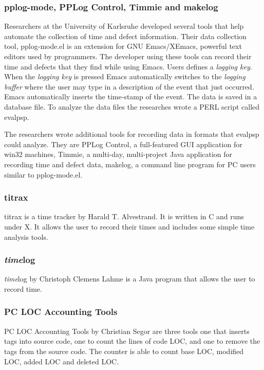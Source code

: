 \subsubsection{pplog-mode, PPLog Control, Timmie and makelog}
Researchers at the University of Karlsruhe developed several tools that help
automate the collection of time and defect information\cite{Resources98}. Their
data collection tool, pplog-mode.el is an extension for GNU
Emacs\cite{GNUEmacs99}/XEmacs\cite{XEmacs99}, powerful text editors used by
programmers.  The developer using these tools can record their time and defects
that they find while using Emacs. Users defines a {\em logging key}.  When the
{\em logging key} is pressed Emacs automatically switches to the {\em logging
  buffer} where the user may type in a description of the event that just
occurred.  Emacs automatically inserts the time-stamp of the event.  The data is
saved in a database file.  To analyze the data files the researches wrote a
PERL script called evalpsp.

The researchers wrote additional tools for recording data in formats that
evalpsp could analyze. They are PPLog Control, a full-featured GUI application
for win32 machines, Timmie, a multi-day, multi-project Java application for
recording time and defect data, makelog, a command line program for PC users
similar to pplog-mode.el.

\subsubsection{titrax}

titrax\cite{Alvestrand99} is a time tracker by Harald T. Alvestrand.  It
is written in C and runs under X.  It allows the user to record their times and
includes some simple time analysis tools.

\subsubsection{{\em time}log}
{\em time}log\cite{Clemens99} by Christoph Clemens Lahme is a Java program
  that allows the user to record time.

\subsubsection{PC LOC Accounting Tools}

PC LOC Accounting Tools\cite{Resources98} by Christian Segor are three
tools one that inserts tags into source code, one to count the lines of code
LOC, and one to remove the tags from the source code. The counter is able to
count base LOC, modified LOC, added LOC and deleted LOC.

